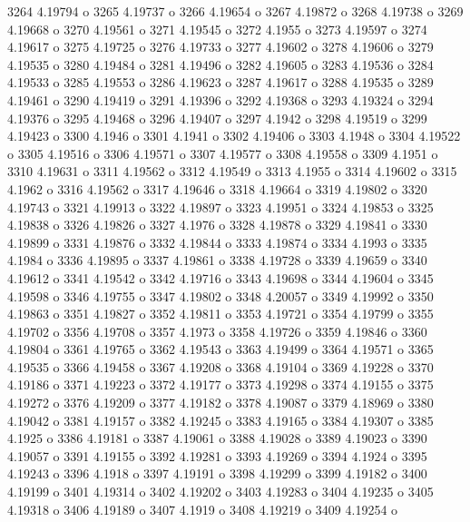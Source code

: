  3264  4.19794  o
 3265  4.19737  o
 3266  4.19654  o
 3267  4.19872  o
 3268  4.19738  o
 3269  4.19668  o
 3270  4.19561  o
 3271  4.19545  o
 3272  4.1955  o
 3273  4.19597  o
 3274  4.19617  o
 3275  4.19725  o
 3276  4.19733  o
 3277  4.19602  o
 3278  4.19606  o
 3279  4.19535  o
 3280  4.19484  o
 3281  4.19496  o
 3282  4.19605  o
 3283  4.19536  o
 3284  4.19533  o
 3285  4.19553  o
 3286  4.19623  o
 3287  4.19617  o
 3288  4.19535  o
 3289  4.19461  o
 3290  4.19419  o
 3291  4.19396  o
 3292  4.19368  o
 3293  4.19324  o
 3294  4.19376  o
 3295  4.19468  o
 3296  4.19407  o
 3297  4.1942  o
 3298  4.19519  o
 3299  4.19423  o
 3300  4.1946  o
 3301  4.1941  o
 3302  4.19406  o
 3303  4.1948  o
 3304  4.19522  o
 3305  4.19516  o
 3306  4.19571  o
 3307  4.19577  o
 3308  4.19558  o
 3309  4.1951  o
 3310  4.19631  o
 3311  4.19562  o
 3312  4.19549  o
 3313  4.1955  o
 3314  4.19602  o
 3315  4.1962  o
 3316  4.19562  o
 3317  4.19646  o
 3318  4.19664  o
 3319  4.19802  o
 3320  4.19743  o
 3321  4.19913  o
 3322  4.19897  o
 3323  4.19951  o
 3324  4.19853  o
 3325  4.19838  o
 3326  4.19826  o
 3327  4.1976  o
 3328  4.19878  o
 3329  4.19841  o
 3330  4.19899  o
 3331  4.19876  o
 3332  4.19844  o
 3333  4.19874  o
 3334  4.1993  o
 3335  4.1984  o
 3336  4.19895  o
 3337  4.19861  o
 3338  4.19728  o
 3339  4.19659  o
 3340  4.19612  o
 3341  4.19542  o
 3342  4.19716  o
 3343  4.19698  o
 3344  4.19604  o
 3345  4.19598  o
 3346  4.19755  o
 3347  4.19802  o
 3348  4.20057  o
 3349  4.19992  o
 3350  4.19863  o
 3351  4.19827  o
 3352  4.19811  o
 3353  4.19721  o
 3354  4.19799  o
 3355  4.19702  o
 3356  4.19708  o
 3357  4.1973  o
 3358  4.19726  o
 3359  4.19846  o
 3360  4.19804  o
 3361  4.19765  o
 3362  4.19543  o
 3363  4.19499  o
 3364  4.19571  o
 3365  4.19535  o
 3366  4.19458  o
 3367  4.19208  o
 3368  4.19104  o
 3369  4.19228  o
 3370  4.19186  o
 3371  4.19223  o
 3372  4.19177  o
 3373  4.19298  o
 3374  4.19155  o
 3375  4.19272  o
 3376  4.19209  o
 3377  4.19182  o
 3378  4.19087  o
 3379  4.18969  o
 3380  4.19042  o
 3381  4.19157  o
 3382  4.19245  o
 3383  4.19165  o
 3384  4.19307  o
 3385  4.1925  o
 3386  4.19181  o
 3387  4.19061  o
 3388  4.19028  o
 3389  4.19023  o
 3390  4.19057  o
 3391  4.19155  o
 3392  4.19281  o
 3393  4.19269  o
 3394  4.1924  o
 3395  4.19243  o
 3396  4.1918  o
 3397  4.19191  o
 3398  4.19299  o
 3399  4.19182  o
 3400  4.19199  o
 3401  4.19314  o
 3402  4.19202  o
 3403  4.19283  o
 3404  4.19235  o
 3405  4.19318  o
 3406  4.19189  o
 3407  4.1919  o
 3408  4.19219  o
 3409  4.19254  o
